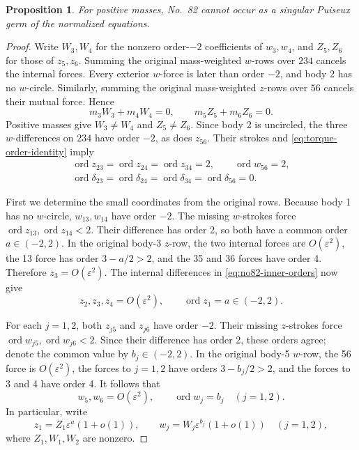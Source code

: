 \documentclass[11pt]{amsart}
\newtheorem{proposition}[theorem]{Proposition}
\theoremstyle{remark}
\newcommand{\ord}{\operatorname{ord}}
\begin{document}
\begin{proposition}\label{prop:no82-excluded}
For positive masses, No.~82 cannot occur as a singular Puiseux germ of the normalized equations.
\end{proposition}
\begin{proof}
Write $W_3,W_4$ for the nonzero order-$-2$ coefficients of $w_3,w_4$, and $Z_5,Z_6$ for those of $z_5,z_6$. Summing the original mass-weighted $w$-rows over $234$ cancels the internal forces. Every exterior $w$-force is later than order $-2$, and body 2 has no $w$-circle. Similarly, summing the original mass-weighted $z$-rows over $56$ cancels their mutual force. Hence
\begin{equation}\label{eq:no82-leading-centres}
m_3W_3+m_4W_4=0,\qquad m_5Z_5+m_6Z_6=0.
\end{equation}
Positive masses give $W_3\ne W_4$ and $Z_5\ne Z_6$. Since body 2 is uncircled, the three $w$-differences on $234$ have order $-2$, as does $z_{56}$. Their strokes and \eqref{eq:torque-order-identity} imply
\begin{equation}\label{eq:no82-inner-orders}
\begin{gathered}
\ord z_{23}=\ord z_{24}=\ord z_{34}=2,\qquad \ord w_{56}=2,\\
\ord\delta_{23}=\ord\delta_{24}=\ord\delta_{34}=\ord\delta_{56}=0.
\end{gathered}
\end{equation}

First we determine the small coordinates from the original rows. Because body 1 has no $w$-circle, $w_{13},w_{14}$ have order $-2$. The missing $w$-strokes force $\ord z_{13},\ord z_{14}<2$. Their difference has order 2, so both have a common order $a\in(-2,2)$. In the original body-3 $z$-row, the two internal forces are $O(\varepsilon^2)$, the 13 force has order $3-a/2>2$, and the 35 and 36 forces have order 4. Therefore $z_3=O(\varepsilon^2)$. The internal differences in \eqref{eq:no82-inner-orders} now give
\begin{equation}\label{eq:no82-small-z}
z_2,z_3,z_4=O(\varepsilon^2),\qquad \ord z_1=a\in(-2,2).
\end{equation}

For each $j=1,2$, both $z_{j5}$ and $z_{j6}$ have order $-2$. Their missing $z$-strokes force $\ord w_{j5},\ord w_{j6}<2$. Since their difference has order 2, these orders agree; denote the common value by $b_j\in(-2,2)$. In the original body-5 $w$-row, the 56 force is $O(\varepsilon^2)$, the forces to $j=1,2$ have orders $3-b_j/2>2$, and the forces to 3 and 4 have order 4. It follows that
\begin{equation}\label{eq:no82-small-w}
w_5,w_6=O(\varepsilon^2),\qquad \ord w_j=b_j\quad(j=1,2).
\end{equation}
In particular, write
\[
z_1=Z_1\varepsilon^a(1+o(1)),\qquad
w_j=W_j\varepsilon^{b_j}(1+o(1))\quad(j=1,2),
\]
where $Z_1,W_1,W_2$ are nonzero.


\end{proof}
\end{document}
